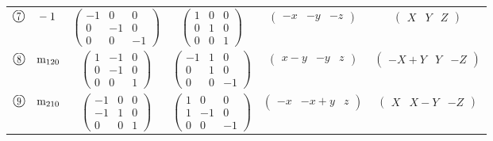 \documentclass[fleqn,10pt,landscape]{jsarticle}
\begin{document}
\begin{center}
\begin{longtable}{lcccc}
$ {\ooalign{\hfil\resizebox{.8\width}{\height}{7}\hfil\crcr\raise.1ex\hbox{\large$\bigcirc$}}}\quad -1 $ & $ \begin{pmatrix} -1 & 0 & 0 \\ 0 & -1 & 0 \\ 0 & 0 & -1 \end{pmatrix} $ & $ \begin{pmatrix} 1 & 0 & 0 \\ 0 & 1 & 0 \\ 0 & 0 & 1 \end{pmatrix} $ & $ \begin{pmatrix} - x & - y & - z \end{pmatrix} $ & $ \begin{pmatrix} X & Y & Z \end{pmatrix} $ \\
$ {\ooalign{\hfil\resizebox{.8\width}{\height}{8}\hfil\crcr\raise.1ex\hbox{\large$\bigcirc$}}}\quad {\rm m}_{120} $ & $ \begin{pmatrix} 1 & -1 & 0 \\ 0 & -1 & 0 \\ 0 & 0 & 1 \end{pmatrix} $ & $ \begin{pmatrix} -1 & 1 & 0 \\ 0 & 1 & 0 \\ 0 & 0 & -1 \end{pmatrix} $ & $ \begin{pmatrix} x - y & - y & z \end{pmatrix} $ & $ \begin{pmatrix} - X + Y & Y & - Z \end{pmatrix} $ \\
$ {\ooalign{\hfil\resizebox{.8\width}{\height}{9}\hfil\crcr\raise.1ex\hbox{\large$\bigcirc$}}}\quad {\rm m}_{210} $ & $ \begin{pmatrix} -1 & 0 & 0 \\ -1 & 1 & 0 \\ 0 & 0 & 1 \end{pmatrix} $ & $ \begin{pmatrix} 1 & 0 & 0 \\ 1 & -1 & 0 \\ 0 & 0 & -1 \end{pmatrix} $ & $ \begin{pmatrix} - x & - x + y & z \end{pmatrix} $ & $ \begin{pmatrix} X & X - Y & - Z \end{pmatrix} $ \\

\end{longtable}
\end{center}
\end{document}
